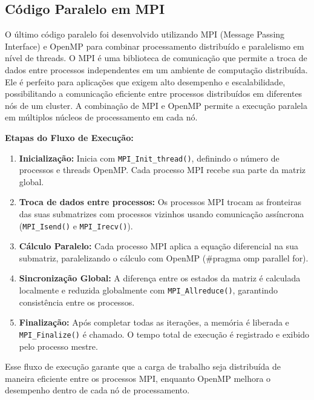 \documentclass[12pt]{article}
\begin{document}
\subsection{Código Paralelo em MPI}

O último código paralelo foi desenvolvido utilizando MPI (Message Passing
Interface) e OpenMP para combinar processamento distribuído e paralelismo em
nível de threads. O MPI é uma biblioteca de comunicação que permite a troca de
dados entre processos independentes em um ambiente de computação distribuída.
Ele é perfeito para aplicações que exigem alto desempenho e escalabilidade,
possibilitando a comunicação eficiente entre processos distribuídos em
diferentes nós de um cluster. A combinação de MPI e OpenMP permite a execução
paralela em múltiplos núcleos de processamento em cada nó.

\textbf{Etapas do Fluxo de Execução:}
\begin{enumerate}
  \item \textbf{Inicialização:} Inicia com \texttt{MPI\_Init\_thread()}, definindo o número de processos e threads OpenMP. Cada processo MPI recebe sua parte da matriz global.
  \item \textbf{Troca de dados entre processos:} Os processos MPI trocam as fronteiras das suas submatrizes com processos vizinhos usando comunicação assíncrona (\texttt{MPI\_Isend()} e \texttt{MPI\_Irecv()}).
  \item \textbf{Cálculo Paralelo:} Cada processo MPI aplica a equação diferencial na sua submatriz, paralelizando o cálculo com OpenMP (\#pragma omp parallel for).
  \item \textbf{Sincronização Global:} A diferença entre os estados da matriz é calculada localmente e reduzida globalmente com \texttt{MPI\_Allreduce()}, garantindo consistência entre os processos.
  \item \textbf{Finalização:} Após completar todas as iterações, a memória é liberada e \texttt{MPI\_Finalize()} é chamado. O tempo total de execução é registrado e exibido pelo processo mestre.
\end{enumerate}

Esse fluxo de execução garante que a carga de trabalho seja distribuída de
maneira eficiente entre os processos MPI, enquanto OpenMP melhora o desempenho
dentro de cada nó de processamento.
\end{document}
